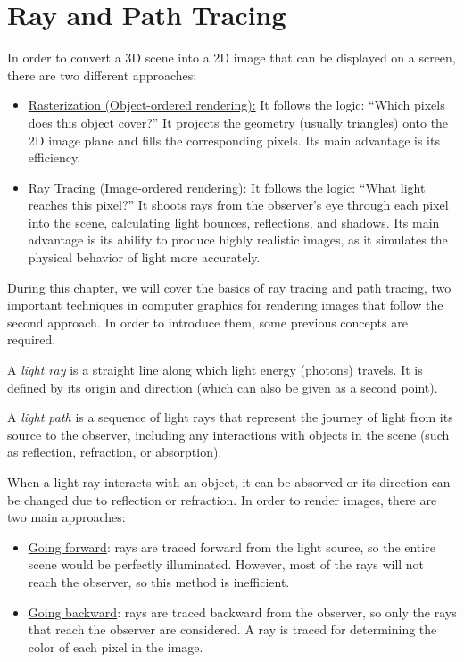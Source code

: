 \chapter{Ray and Path Tracing}

In order to convert a 3D scene into a 2D image that can be displayed on a screen, there are two different approaches:
\begin{itemize}
    \item \ul{Rasterization (Object-ordered rendering):} 
    It follows the logic: ``Which pixels does this object cover?'' 
    It projects the geometry (usually triangles) onto the 2D image plane and fills the corresponding pixels. Its main advantage is its efficiency.

    \item \ul{Ray Tracing (Image-ordered rendering):} 
    It follows the logic: ``What light reaches this pixel?'' 
    It shoots rays from the observer's eye through each pixel into the scene, calculating light bounces, reflections, and shadows. Its main advantage is its ability to produce highly realistic images, as it simulates the physical behavior of light more accurately.
\end{itemize}

During this chapter, we will cover the basics of ray tracing and path tracing, two important techniques in computer graphics for rendering images that follow the second approach. In order to introduce them, some previous concepts are required.

\begin{definicion}
    A \emph{light ray} is a straight line along which light energy (photons) travels. It is defined by its origin and direction (which can also be given as a second point).
\end{definicion}

\begin{definicion}
    A \emph{light path} is a sequence of light rays that represent the journey of light from its source to the observer, including any interactions with objects in the scene (such as reflection, refraction, or absorption).
\end{definicion}

When a light ray interacts with an object, it can be absorved or its direction can be changed due to reflection or refraction. In order to render images, there are two main approaches:
\begin{itemize}
    \item \ul{Going forward}: rays are traced forward from the light source, so the entire scene would be perfectly illuminated. However, most of the rays will not reach the observer, so this method is inefficient.
    \item \ul{Going backward}: rays are traced backward from the observer, so only the rays that reach the observer are considered. A ray is traced for determining the color of each pixel in the image.
\end{itemize}

